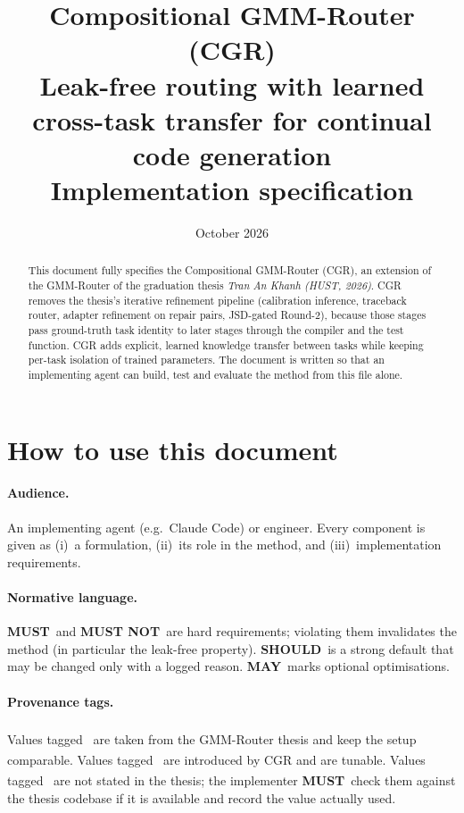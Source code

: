 \documentclass[11pt]{article}
\title{\textbf{Compositional GMM-Router (CGR)}\\[4pt]
\large Leak-free routing with learned cross-task transfer for continual code generation\\[2pt]
\normalsize Implementation specification}
\author{}
\date{October 2026}
\newcommand{\tagthesis}{\textsuperscript{\textcolor{teal!70!black}{\sffamily[thesis]}}}
\newcommand{\tagnew}{\textsuperscript{\textcolor{orange!80!black}{\sffamily[new]}}}
\newcommand{\tagassumed}{\textsuperscript{\textcolor{red!70!black}{\sffamily[assumed]}}}
\newcommand{\MUST}{\textbf{MUST}}
\newcommand{\MUSTNOT}{\textbf{MUST NOT}}
\newcommand{\SHOULD}{\textbf{SHOULD}}
\newcommand{\MAY}{\textbf{MAY}}
\begin{document}
\maketitle

\begin{abstract}
\noindent This document fully specifies the Compositional GMM-Router (CGR), an extension of the GMM-Router of the
graduation thesis \emph{Tran An Khanh (HUST, 2026)}. CGR removes the thesis's iterative refinement pipeline
(calibration inference, traceback router, adapter refinement on repair pairs, JSD-gated Round-2), because those
stages pass ground-truth task identity to later stages through the compiler and the test function. CGR adds
explicit, learned knowledge transfer between tasks while keeping per-task isolation of trained parameters. The
document is written so that an implementing agent can build, test and evaluate the method from this file alone.
\end{abstract}

\tableofcontents
\newpage

\section{How to use this document}

\paragraph{Audience.} An implementing agent (e.g.\ Claude Code) or engineer. Every component is given as
(i)~a formulation, (ii)~its role in the method, and (iii)~implementation requirements.

\paragraph{Normative language.} \MUST\ and \MUSTNOT\ are hard requirements; violating them invalidates the
method (in particular the leak-free property). \SHOULD\ is a strong default that may be changed only with a
logged reason. \MAY\ marks optional optimisations.

\paragraph{Provenance tags.} Values tagged \tagthesis\ are taken from the GMM-Router thesis and keep the setup
comparable. Values tagged \tagnew\ are introduced by CGR and are tunable. Values tagged \tagassumed\ are not
stated in the thesis; the implementer \MUST\ check them against the thesis codebase if it is available and
record the value actually used.
\end{document}

